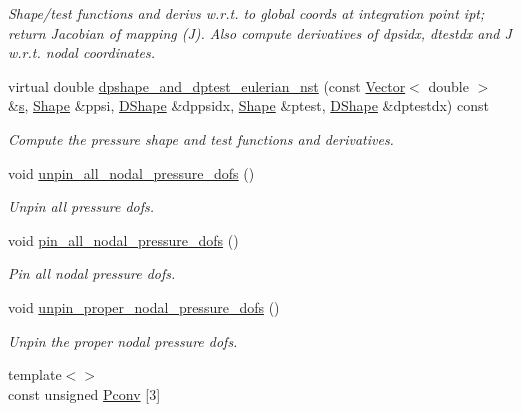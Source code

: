\begin{DoxyCompactItemize}
\begin{DoxyCompactList}\small\item\em Shape/test functions and derivs w.\+r.\+t. to global coords at integration point ipt; return Jacobian of mapping (J). Also compute derivatives of dpsidx, dtestdx and J w.\+r.\+t. nodal coordinates. \end{DoxyCompactList}\item 
virtual double \hyperlink{classoomph_1_1GeneralisedNewtonianTTaylorHoodElement_ac2f4d98477e957acde19e3753e334a8c}{dpshape\+\_\+and\+\_\+dptest\+\_\+eulerian\+\_\+nst} (const \hyperlink{classoomph_1_1Vector}{Vector}$<$ double $>$ \&\hyperlink{cfortran_8h_ab7123126e4885ef647dd9c6e3807a21c}{s}, \hyperlink{classoomph_1_1Shape}{Shape} \&ppsi, \hyperlink{classoomph_1_1DShape}{D\+Shape} \&dppsidx, \hyperlink{classoomph_1_1Shape}{Shape} \&ptest, \hyperlink{classoomph_1_1DShape}{D\+Shape} \&dptestdx) const
\begin{DoxyCompactList}\small\item\em Compute the pressure shape and test functions and derivatives. \end{DoxyCompactList}\item 
void \hyperlink{classoomph_1_1GeneralisedNewtonianTTaylorHoodElement_a95c4970377a6319f93c5c1192bfe20bd}{unpin\+\_\+all\+\_\+nodal\+\_\+pressure\+\_\+dofs} ()
\begin{DoxyCompactList}\small\item\em Unpin all pressure dofs. \end{DoxyCompactList}\item 
void \hyperlink{classoomph_1_1GeneralisedNewtonianTTaylorHoodElement_a4416a4c750d3dfc0f24a3b0ad82b9eb9}{pin\+\_\+all\+\_\+nodal\+\_\+pressure\+\_\+dofs} ()
\begin{DoxyCompactList}\small\item\em Pin all nodal pressure dofs. \end{DoxyCompactList}\item 
void \hyperlink{classoomph_1_1GeneralisedNewtonianTTaylorHoodElement_a50311f433da3a1a6db09cb855c4a94ae}{unpin\+\_\+proper\+\_\+nodal\+\_\+pressure\+\_\+dofs} ()
\begin{DoxyCompactList}\small\item\em Unpin the proper nodal pressure dofs. \end{DoxyCompactList}\item 
{\footnotesize template$<$$>$ }\\const unsigned \hyperlink{classoomph_1_1GeneralisedNewtonianTTaylorHoodElement_a134794a357cd976138bc7036c9c3cb6f}{Pconv} \mbox{[}3\mbox{]}

\end{DoxyCompactItemize}
